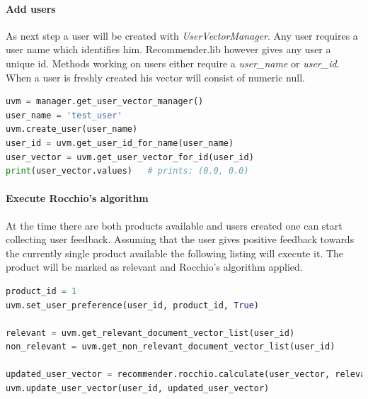 \paragraph{Add users}
As next step a user will be created with \textit{UserVectorManager}.
Any user requires a user name which identifies him.
Recommender.lib however gives any user a unique id.
Methods working on users either require a \textit{user\_name} or \textit{user\_id}.
When a user is freshly created his vector will consist of numeric null.
\begin{lstlisting}[language=Python,caption={Add user},label={lst:recommenderlib-user-add}]
uvm = manager.get_user_vector_manager()
user_name = 'test_user'
uvm.create_user(user_name)
user_id = uvm.get_user_id_for_name(user_name)
user_vector = uvm.get_user_vector_for_id(user_id)
print(user_vector.values)   # prints: (0.0, 0.0)
\end{lstlisting}

\paragraph{Execute Rocchio's algorithm}
At the time there are both products available and users created one can start collecting user feedback.
Assuming that the user gives positive feedback towards the currently single product available the following listing will execute it.
The product will be marked as relevant and Rocchio's algorithm applied.
\begin{lstlisting}[language=Python,caption={Execute Rocchio's algorithm},label={lst:recommenderlib-rocchio}]
product_id = 1
uvm.set_user_preference(user_id, product_id, True)

relevant = uvm.get_relevant_document_vector_list(user_id)
non_relevant = uvm.get_non_relevant_document_vector_list(user_id)

updated_user_vector = recommender.rocchio.calculate(user_vector, relevant, non_relevant)
uvm.update_user_vector(user_id, updated_user_vector)
\end{lstlisting}

